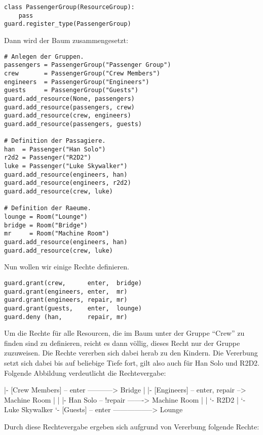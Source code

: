 \begin{lstlisting}
class PassengerGroup(ResourceGroup):
    pass
guard.register_type(PassengerGroup)
\end{lstlisting}

Dann wird der Baum zusammengesetzt:

\begin{lstlisting}
# Anlegen der Gruppen.
passengers = PassengerGroup("Passenger Group")
crew       = PassengerGroup("Crew Members")
engineers  = PassengerGroup("Engineers")
guests     = PassengerGroup("Guests")
guard.add_resource(None, passengers)
guard.add_resource(passengers, crew)
guard.add_resource(crew, engineers)
guard.add_resource(passengers, guests)

# Definition der Passagiere.
han  = Passenger("Han Solo")
r2d2 = Passenger("R2D2")
luke = Passenger("Luke Skywalker")
guard.add_resource(engineers, han)
guard.add_resource(engineers, r2d2)
guard.add_resource(crew, luke)

# Definition der Raeume.
lounge = Room("Lounge")
bridge = Room("Bridge")
mr     = Room("Machine Room")
guard.add_resource(engineers, han)
guard.add_resource(crew, luke)
\end{lstlisting}

Nun wollen wir einige Rechte definieren.

\begin{lstlisting}
guard.grant(crew,      enter,  bridge)
guard.grant(engineers, enter,  mr)
guard.grant(engineers, repair, mr)
guard.grant(guests,    enter,  lounge)
guard.deny (han,       repair, mr)
\end{lstlisting}

Um die Rechte für alle Resourcen, die im Baum unter der Gruppe ``Crew'' zu 
finden sind zu definieren, reicht es dann völlig, dieses Recht nur der 
Gruppe zuzuweisen. Die Rechte vererben sich dabei herab zu den Kindern. 
Die Vererbung setzt sich dabei bis auf beliebige Tiefe fort, gilt also auch 
für Han Solo und R2D2. Folgende Abbildung verdeutlicht die Rechtevergabe:

\begin{indentverb}
[Passengers]
  |- [Crew Members] -- enter -----------> Bridge
  |   |- [Engineers] -- enter, repair --> Machine Room
  |   |   |- Han Solo -- !repair -------> Machine Room
  |   |   `- R2D2
  |   `- Luke Skywalker
  `- [Guests] -- enter -----------------> Lounge
\end{indentverb}

Durch diese Rechtevergabe ergeben sich aufgrund von Vererbung folgende Rechte:

